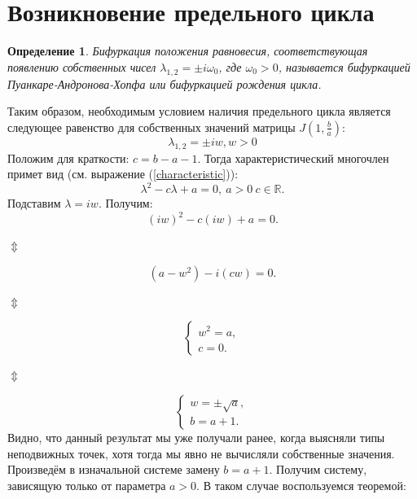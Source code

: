 \documentclass[12pt]{article}
\newtheorem{definition}{Определение}
\begin{document}
\newpage
\section{Возникновение предельного цикла}
\begin{definition}
    Бифуркация положения равновесия, соответствующая появлению собственных чисел $\lambda_{1,2} = \pm i\omega_0$, где $\omega_0 > 0$, называется бифуркацией Пуанкаре-Андронова-Хопфа или бифуркацией рождения цикла.
\end{definition}
Таким образом, необходимым условием наличия предельного цикла является следующее равенство для собственных значений матрицы $J\left(1, \frac{b}{a}\right)$:
$$
    \lambda_{1,2} = \pm iw, w > 0
$$
Положим для краткости: $c = b - a - 1$. Тогда характеристический многочлен примет вид (см. выражение (\ref{characteristic})):
$$
    \lambda^2 - c\lambda + a = 0, ~ a >0 ~ c \in\mathbb{R}.
$$
Подставим $\lambda = iw$. Получим:
$$
    (iw)^2 - c(iw) + a = 0.
$$
\begin{center}
    $\Updownarrow$
\end{center}
$$
    (a - w^2) - i(cw) = 0.
$$
\begin{center}
    $\Updownarrow$
\end{center}
\begin{equation}
    \begin{cases}
        w^2 = a,\\
        c = 0.
    \end{cases}
\end{equation}
\begin{center}
    $\Updownarrow$
\end{center}
\begin{equation}
    \begin{cases}
        w = \pm \sqrt{a},\\
        b = a + 1.
    \end{cases}
\end{equation}
Видно, что данный результат мы уже получали ранее, когда выясняли типы неподвижных точек, хотя тогда мы явно не вычисляли собственные значения. Произведём в изначальной системе замену $b = a + 1$. Получим систему, зависящую только от параметра $a > 0$. В таком случае воспользуемся теоремой:
\end{document}
